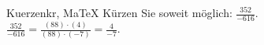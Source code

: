 \begin{MAufgabe}{Kuerzen}{kr, MaTeX}
K\"urzen Sie soweit m\"oglich: $\frac{352}{-616}$.\\ 
\ifLsg\MLoesung
\quad $\frac{352}{-616}=\frac{(88)\cdot(4)}{(88)\cdot(-7)}=\frac{4}{-7}$.\else\relax\fi
 \end{MAufgabe}